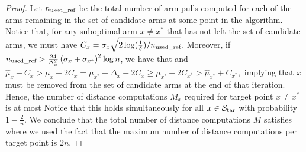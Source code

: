 \begin{proof}
Let $n_{\text{used\_ref}}$ be the total number of arm pulls computed for each of the arms remaining in the set of candidate arms at some point in the algorithm.
Notice that, for any suboptimal arm $x \ne x^*$ that has not left the set of candidate arms, we must have
$C_x = \sigma_x \sqrt{ 2 \log(\tfrac{1}{\delta}) /n_{\text{used\_ref}}}$.
Moreover, if $n_{\text{used\_ref}} > \frac{24}{\Delta_x^2} \left(\sigma_x+\sigma_{x^*}\right)^2 \log n$,
we have that
and 
$
\hat \mu_x - C_x > \mu_x - 2C_x = \mu_{x^*} + \Delta_x - 2C_x 
\geq \mu_{x^*} + 2 C_{x^*} > \hat \mu_{x^*} + C_{x^*},
$
implying that $x$ must be removed from the set of candidate arms at the end of that iteration.
Hence, the number of distance computations $M_x$ required for target point $x \ne x^*$ is at most
Notice that this holds simultaneously for all $x \in \mathcal{S}_{\text{tar}}$ with probability $1-\tfrac{2}{n}$.
We conclude that the total number of distance computations $M$ satisfies
where we used the fact that the maximum number of distance computations per target point is $2n$.
\end{proof}
